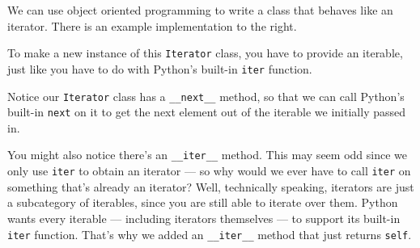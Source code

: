 We can use object oriented programming to write a class that behaves like an
iterator.
There is an example implementation to the right.

To make a new instance of this \lstinline$Iterator$ class, you have to provide
an iterable, just like you have to do with Python's built-in \lstinline$iter$
function.

Notice our \lstinline$Iterator$ class has a \lstinline$__next__$ method,
so that we can call Python's built-in \lstinline$next$ on it to get the next
element out of the iterable we initially passed in.

You might also notice there's an \lstinline$__iter__$ method.
This may seem odd since we only use \lstinline$iter$ to obtain an iterator —
so why would we ever have to call \lstinline$iter$ on something that's already
an iterator?
Well, technically speaking, iterators are just a subcategory of iterables,
since you are still able to iterate over them.
Python wants every iterable — including iterators themselves — to support its
built-in \lstinline$iter$ function.
That's why we added an \lstinline$__iter__$ method that just returns
\lstinline$self$.
